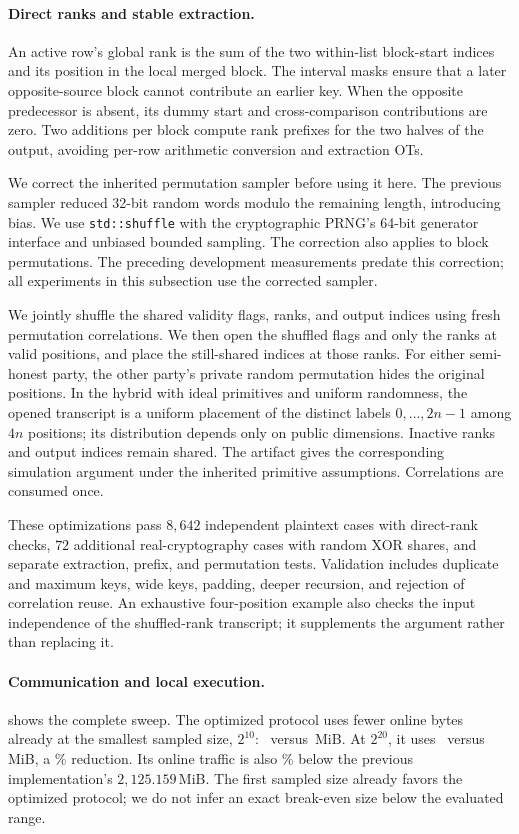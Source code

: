 \paragraph{Direct ranks and stable extraction.}
An active row's global rank is the sum of the two within-list block-start
indices and its position in the local merged block.
The interval masks ensure that a later opposite-source block cannot contribute
an earlier key. When the opposite predecessor is absent, its dummy start and
cross-comparison contributions are zero. Two additions per block compute rank
prefixes for the two halves of the output, avoiding per-row arithmetic conversion
and extraction OTs.

We correct the inherited permutation sampler before using it here.
The previous sampler reduced 32-bit random words modulo the remaining length,
introducing bias. We use \texttt{std::shuffle} with the cryptographic PRNG's
64-bit generator interface and unbiased bounded sampling.
The correction also applies to block permutations.
The preceding development measurements predate this correction; all experiments
in this subsection use the corrected sampler.

We jointly shuffle the shared validity flags, ranks, and output indices using
fresh permutation correlations. We then open the shuffled flags and only the
ranks at valid positions, and place the still-shared indices at those ranks.
For either semi-honest party, the other party's private random permutation hides
the original positions. In the hybrid with ideal primitives and uniform randomness,
the opened transcript is a uniform placement of the
distinct labels $0,\ldots,2n-1$ among $4n$ positions; its distribution depends
only on public dimensions. Inactive ranks and output indices remain shared.
The artifact gives the corresponding simulation argument under the inherited
primitive assumptions. Correlations are consumed once.

These optimizations pass $8{,}642$ independent plaintext cases with direct-rank
checks, $72$ additional real-cryptography cases with random XOR shares, and
separate extraction, prefix, and permutation tests. Validation includes duplicate and maximum
keys, wide keys, padding, deeper recursion, and rejection of correlation reuse.
An exhaustive four-position example also checks the input independence of the
shuffled-rank transcript; it supplements the argument rather than replacing it.

\paragraph{Communication and local execution.}
 shows the complete sweep.
The optimized protocol uses fewer online bytes already at the smallest sampled
size, $2^{10}$: \packedSmallPi\ versus \packedSmallBatcher\,MiB.
At $2^{20}$, it uses \packedLargePi\ versus \packedLargeBatcher\,MiB,
a \packedLargeReduction\% reduction. Its online traffic is also
\packedReductionOld\% below the previous implementation's $2{,}125.159$\,MiB.
The first sampled size already favors the optimized protocol; we do not infer
an exact break-even size below the evaluated range.


